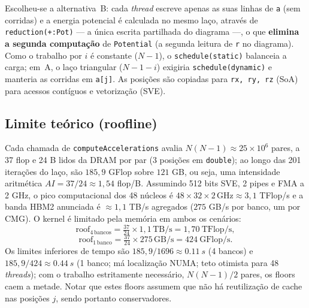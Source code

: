 \documentclass[conference]{IEEEtran}
\begin{document}
\noindent Escolheu-se a alternativa~B: cada \textit{thread} escreve apenas as suas linhas de \texttt{a} (sem corridas) e a energia potencial é calculada no mesmo laço, através de \texttt{reduction(+:Pot)} --- a única escrita partilhada do diagrama ---, o que \textbf{elimina a segunda computação} de \texttt{Potential} (a segunda leitura de \texttt{r} no diagrama). Como o trabalho por $i$ é constante ($N{-}1$), o \texttt{schedule(static)} balanceia a carga; em~A, o laço triangular ($N{-}1{-}i$) exigiria \texttt{schedule(dynamic)} e manteria as corridas em \texttt{a[j]}. As posições são copiadas para \texttt{rx, ry, rz} (SoA) para acessos contíguos e vetorização (SVE).

\subsection{Limite teórico (roofline)}\label{ROOF}
Cada chamada de \texttt{computeAccelerations} avalia $N(N{-}1)\approx25\times10^{6}$ pares, a 37 flop e 24 B lidos da DRAM por par (3 posições em \texttt{double}); ao longo das 201 iterações do laço, são $185{,}9$ GFlop sobre $121$ GB, ou seja, uma intensidade aritmética $\textit{AI}=37/24\approx1{,}54$ flop/B. Assumindo 512 bits SVE, 2 pipes e FMA a 2 GHz, o pico computacional dos 48 núcleos é $48\times32\times2\,\text{GHz}\approx3{,}1$ TFlop/s e a banda HBM2 anunciada é $\approx1{,}1$ TB/s agregados ($275$ GB/s por banco, um por CMG). O kernel é limitado pela memória em ambos os cenários:
\begin{equation}\label{eq:roof}
\text{roof}_{4\,\text{bancos}}=\tfrac{37}{24}\times1{,}1\,\text{TB/s}=1{,}70\ \text{TFlop/s},
\end{equation}
\begin{equation}\label{eq:roof1}
\text{roof}_{1\,\text{banco}}=\tfrac{37}{24}\times275\,\text{GB/s}=424\ \text{GFlop/s}.
\end{equation}
Os limites inferiores de tempo são $185{,}9/1696\approx\SI{0.11}{s}$ (4 bancos) e $185{,}9/424\approx\SI{0.44}{s}$ (1 banco; má localização NUMA; teto otimista para 48 \textit{threads}); com o trabalho estritamente necessário, $N(N{-}1)/2$ pares, os floors caem a metade. Notar que estes floors assumem que não há reutilização de cache nas posições $j$, sendo portanto conservadores.
\end{document}
